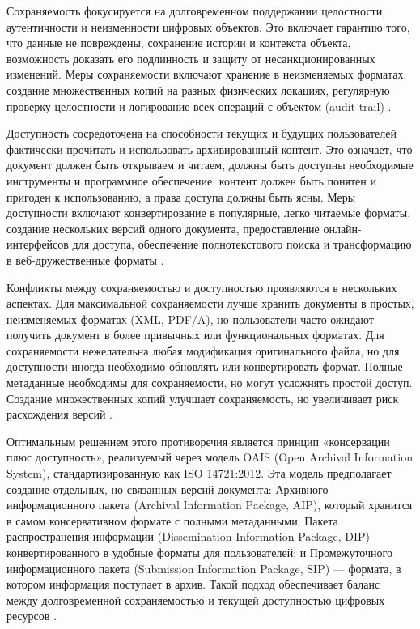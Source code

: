 \documentclass{SibFU-docs}
\begin{document}
Сохраняемость фокусируется на долговременном поддержании целостности, аутентичности и неизменности цифровых объектов. Это включает гарантию того, что данные не повреждены, сохранение истории и контекста объекта, возможность доказать его подлинность и защиту от несанкционированных изменений. Меры сохраняемости включают хранение в неизменяемых форматах, создание множественных копий на разных физических локациях, регулярную проверку целостности и логирование всех операций с объектом (audit trail) \cite{Rutgers2005ArchitectureTrustedDigitalRepositories}.

Доступность сосредоточена на способности текущих и будущих пользователей фактически прочитать и использовать архивированный контент. Это означает, что документ должен быть открываем и читаем, должны быть доступны необходимые инструменты и программное обеспечение, контент должен быть понятен и пригоден к использованию, а права доступа должны быть ясны. Меры доступности включают конвертирование в популярные, легко читаемые форматы, создание нескольких версий одного документа, предоставление онлайн-интерфейсов для доступа, обеспечение полнотекстового поиска и трансформацию в веб-дружественные форматы \cite{Soutron2025TrustedDigitalRepository}.

Конфликты между сохраняемостью и доступностью проявляются в нескольких аспектах. Для максимальной сохраняемости лучше хранить документы в простых, неизменяемых форматах (XML, PDF/A), но пользователи часто ожидают получить документ в более привычных или функциональных форматах. Для сохраняемости нежелательна любая модификация оригинального файла, но для доступности иногда необходимо обновлять или конвертировать формат. Полные метаданные необходимы для сохраняемости, но могут усложнять простой доступ. Создание множественных копий улучшает сохраняемость, но увеличивает риск расхождения версий \cite{LIS654DigitalPreservation2015MigrationVsEmulation}.

Оптимальным решением этого противоречия является принцип «консервации плюс доступность», реализуемый через модель OAIS (Open Archival Information System), стандартизированную как ISO 14721:2012. Эта модель предполагает создание отдельных, но связанных версий документа: Архивного информационного пакета (Archival Information Package, AIP), который хранится в самом консервативном формате с полными метаданными; Пакета распространения информации (Dissemination Information Package, DIP) — конвертированного в удобные форматы для пользователей; и Промежуточного информационного пакета (Submission Information Package, SIP) — формата, в котором информация поступает в архив. Такой подход обеспечивает баланс между долговременной сохраняемостью и текущей доступностью цифровых ресурсов \cite{Rutgers2005ArchitectureTrustedDigitalRepositories}.
\end{document}
